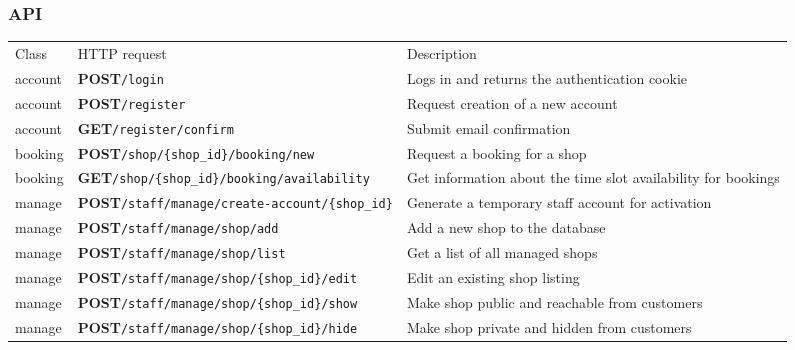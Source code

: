 \subsubsection{API}


\begin{table}[H]
\everyrow{\tabucline[0.5pt]-}
\begin{tabu} to \textwidth {|X|X[4]|X[2.5]|} \hline
Class & HTTP request & Description \\
account & \textbf{POST}\newline \texttt{/login}  & Logs in and returns the authentication  cookie \\
account & \textbf{POST}\newline \texttt{/register}  & Request creation of a new account \\
account & \textbf{GET}\newline \texttt{/register/confirm}  & Submit email confirmation \\
booking & \textbf{POST}\newline \texttt{/shop/\{shop\_id\}/booking/new}  & Request a booking for a shop \\
booking & \textbf{GET}\newline \texttt{/shop/\{shop\_id\}/booking/availability}  & Get information about the time slot availability for bookings \\
manage & \textbf{POST}\newline \texttt{/staff/manage/create-account/\{shop\_id\}}  & Generate a temporary staff account for activation \\
manage & \textbf{POST}\newline \texttt{/staff/manage/shop/add}  & Add a new shop to the database \\
manage & \textbf{POST}\newline \texttt{/staff/manage/shop/list}  & Get a list of all managed shops \\
manage & \textbf{POST}\newline \texttt{/staff/manage/shop/\{shop\_id\}/edit}  & Edit an existing shop listing \\
manage & \textbf{POST}\newline \texttt{/staff/manage/shop/\{shop\_id\}/show}  & Make shop public and reachable from customers \\
manage & \textbf{POST}\newline \texttt{/staff/manage/shop/\{shop\_id\}/hide}  & Make shop private and hidden from customers \\

\end{tabu}
\end{table}
